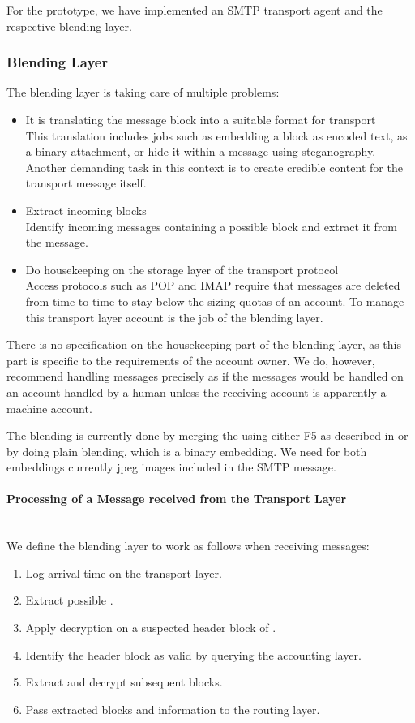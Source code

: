 For the prototype, we have implemented an SMTP transport agent and the respective blending layer.

\subsubsection{Blending Layer\label{sec:blendingLayer}}
The blending layer is taking care of multiple problems:
\begin{itemize}
	\item It is translating the message block into a suitable format for transport\\
	This translation includes jobs such as embedding a block as encoded text, as a binary attachment, or hide it within a message using steganography. Another demanding task in this context is to create credible content for the transport message itself.
	\item Extract incoming blocks\\
	Identify incoming messages containing a possible block and extract it from the message.
	\item Do housekeeping on the storage layer of the transport protocol\\
	Access protocols such as POP and IMAP require that messages are deleted from time to time to stay below the sizing quotas of an account. To manage this transport layer account is the job of the blending layer.
\end{itemize}

There is no specification on the housekeeping part of the blending layer, as this part is specific to the requirements of the account owner. We do, however, recommend handling messages precisely as if the messages would be handled on an account handled by a human unless the receiving account is apparently a machine account. 

The blending is currently done by merging the \VortexMessage{} using either F5 as described in \cite{f5} or by doing plain blending, which is a binary embedding. We need for both embeddings currently jpeg images included in the SMTP message. 

\paragraph{Processing of a Message received from the Transport Layer}~\\
We define the blending layer to work as follows when receiving messages:
\begin{enumerate}
	\item Log arrival time on the transport layer.
	\item Extract possible \VortexMessage.
	\item Apply decryption on a suspected header block of \VortexMessage.
	\item Identify the header block as valid by querying the accounting layer.
	\item Extract and decrypt subsequent blocks.
	\item Pass extracted blocks and information to the routing layer.
\end{enumerate}

